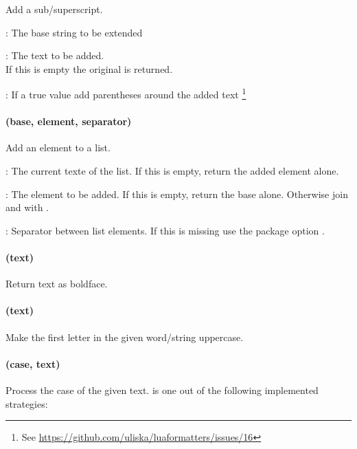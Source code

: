 \documentclass[12pt]{scrartcl}
\begin{document}
Add a sub/superscript.

\begin{itemize*}
\item {}: The base string to be extended
\item {}: The text to be added.\\If this is empty the original
 is returned.
\item {}: If a true value add parentheses around the added text%
\footnote{See \url{https://github.com/uliska/luaformatters/issues/16}}
\end{itemize*}


\paragraph{ (base, element, separator)}

Add an element to a list.

\begin{itemize*}
\item {}: The current texte of the list. If this is empty, return
the added element alone.
\item {}: The element to be added. If this is empty, return the base
alone.  Otherwise join  and  with .
\item {}: Separator between list elements.  If this is missing
use the package option .
\end{itemize*}


\paragraph{ (text)}

Return text as boldface.

\paragraph{ (text)}

Make the first letter in the given word/string uppercase.


\paragraph{ (case, text)}

Process the case of the given text.   is one out of the following
implemented strategies:
\end{document}
